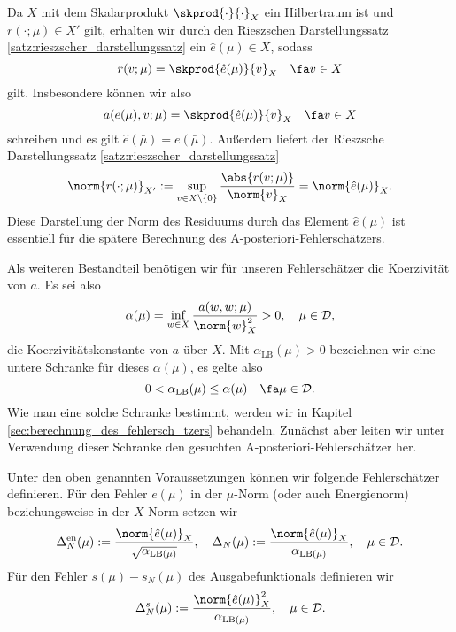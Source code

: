 Da $X$ mit dem Skalarprodukt $\skprod{\cdot}{\cdot}_X$ ein Hilbertraum ist und $r(\cdot; \mu) \in X'$ gilt, erhalten wir durch den Rieszschen Darstellungssatz \ref{satz:rieszscher_darstellungssatz} ein $\hat e(\mu) \in X$, sodass
\begin{equation}
    \label{eq:residuum_riesz}
    r(v; \mu) = \skprod{\hat e(\mu)}{v}_X \quad \fa v \in X
\end{equation}
gilt.
Insbesondere können wir also
\begin{equation}
    \label{eq:a_von_e_gl_skprod_e}
    a(e(\mu), v; \mu) = \skprod{\hat e(\mu)}{v}_X \quad \fa v \in X
\end{equation}
schreiben und es gilt $\hat e(\bar \mu) = e(\bar \mu)$.
Außerdem liefert der Rieszsche Darstellungssatz \ref{satz:rieszscher_darstellungssatz}
\begin{equation}
    \label{eq:residuum_norm_gl_hat_e_norm}
    \norm{r(\cdot; \mu)}_{X'} := \sup_{v \in X \setminus \left\{ 0 \right\}} \frac{\abs{r(v; \mu)}}{\norm{v}_X} = \norm{\hat e(\mu)}_X.
\end{equation}
Diese Darstellung der Norm des Residuums durch das Element $\hat e(\mu)$ ist essentiell für die spätere Berechnung des A-posteriori-Fehlerschätzers.

Als weiteren Bestandteil benötigen wir für unseren Fehlerschätzer die Koerzivität von $a$.
Es sei also
\begin{equation}
            \alpha(\mu) = \inf_{w \in X} \frac{a(w, w; \mu)}{\norm{w}^2_X} > 0, \quad \mu \in \mathcal D,
\end{equation}
die Koerzivitätskonstante von $a$ über $X$.
Mit $\alpha_{\text{LB}}(\mu) > 0$ bezeichnen wir eine untere Schranke für dieses $\alpha(\mu)$, es gelte also
\begin{equation}
    \label{eq:alpha_lb}
    0 < \alpha_{\text{LB}}(\mu) \leq \alpha(\mu) \quad \fa \mu \in \mathcal D.
\end{equation}
Wie man eine solche Schranke bestimmt, werden wir in Kapitel \ref{sec:berechnung_des_fehlersch_tzers} behandeln.
Zunächst aber leiten wir unter Verwendung dieser Schranke den gesuchten A-posteriori-Fehlerschätzer her.

\begin{Definition}
    Unter den oben genannten Voraussetzungen können wir folgende Fehlerschätzer definieren.
    Für den Fehler $e(\mu)$ in der $\mu$-Norm (oder auch Energienorm) beziehungsweise in der $X$-Norm setzen wir
    \begin{equation}
        \Delta^{\text{en}}_N(\mu) := \frac{\norm{\hat e(\mu)}_X}{\sqrt{\alpha_{\text{LB}(\mu)}}}
        , \quad
        \Delta_N(\mu) := \frac{\norm{\hat e(\mu)}_X}{\alpha_{\text{LB}(\mu)}}
        , \quad \mu \in \mathcal D.
    \end{equation}
    Für den Fehler $s(\mu) - s_N(\mu)$ des Ausgabefunktionals definieren wir
    \begin{equation}
        \Delta^s_N(\mu) := \frac{\norm{\hat e(\mu)}_X^2}{\alpha_{\text{LB}(\mu)}}, \quad \mu \in \mathcal D.
    \end{equation}
\end{Definition}

